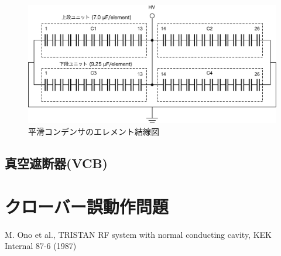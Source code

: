 \documentclass[10pt,a4paper,book,openany]{jlreq}
\theoremstyle{definition}
\begin{document}
\begin{figure}[!htt]
    \begin{center}
        \includegraphics[width=\linewidth]{figs/capacitor.pdf}
        \caption{平滑コンデンサのエレメント結線図}
        \label{capacitor}
    \end{center}
\end{figure}

\subsection{真空遮断器(VCB)}

\section{クローバー誤動作問題}

\begin{thebibliography}{9}
    M. Ono et al., TRISTAN RF system with normal conducting cavity, KEK Internal 87-6 (1987)
\end{thebibliography}
%
\end{document}
